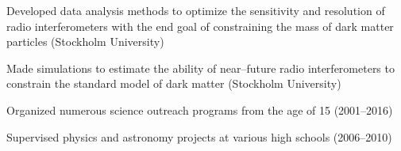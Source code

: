 \begin{cvitems}
    \item \small{Developed data analysis methods to optimize the
      sensitivity and resolution of radio interferometers with the end
      goal of constraining the mass of dark matter particles (Stockholm University)}

    \item \small{Made simulations to estimate the ability of
      near--future radio interferometers to constrain the standard
      model of dark matter (Stockholm University)}

    \item \small{Organized numerous science outreach programs from the
      age of 15 (2001--2016)}

    \item \small{Supervised physics and astronomy projects at various high schools (2006--2010)}



  \end{cvitems}
